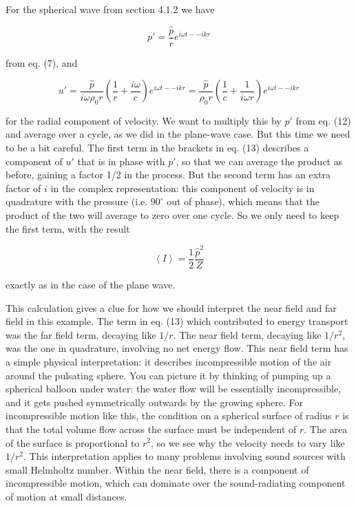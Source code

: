   For the spherical wave from section 4.1.2 we have 

  $$p'=\frac{\hat{p}}{r} e^{i \omega t -- i k r} \tag{12}$$ 

  from eq. (7), and 

  $$u' = \frac{\hat{p}}{i\omega \rho_0 r} \left( \frac{1}{r} +\frac{i 
  \omega}{c} \right) e^{i\omega t -- ikr} = \frac{\hat{p}}{\rho_0 r} 
  \left(\frac{1}{c} + \frac{1}{i \omega r}\right) e^{i\omega t -- 
  ikr}\tag{13}$$ 

  for the radial component of velocity. We want to multiply this by $p'$ from 
  eq. (12) and average over a cycle, as we did in the plane-wave case. But this 
  time we need to be a bit careful. The first term in the brackets in eq. (13) 
  describes a component of $u'$ that is in phase with $p'$, so that we can 
  average the product as before, gaining a factor 1/2 in the process. But the 
  second term has an extra factor of $i$ in the complex representation: this 
  component of velocity is in quadrature with the pressure (i.e. $90^\circ$ out 
  of phase), which means that the product of the two will average to zero over 
  one cycle. So we only need to keep the first term, with the result 

  $$\left< I \right> =\frac{1}{2} \frac{\hat{p}^2}{Z} \tag{14}$$ 

  exactly as in the case of the plane wave. 

  This calculation gives a clue for how we should interpret the near field and 
  far field in this example. The term in eq. (13) which contributed to energy 
  transport was the far field term, decaying like $1/r$. The near field term, 
  decaying like $1/r^2$, was the one in quadrature, involving no net energy 
  flow. This near field term has a simple physical interpretation: it describes 
  incompressible motion of the air around the pulsating sphere. You can picture 
  it by thinking of pumping up a spherical balloon under water: the water flow 
  will be essentially incompressible, and it gets pushed symmetrically outwards 
  by the growing sphere. For incompressible motion like this, the condition on 
  a spherical surface of radius $r$ is that the total volume flow across the 
  surface must be independent of $r$. The area of the surface is proportional 
  to $r^2$, so we see why the velocity needs to vary like $1/r^2$. This 
  interpretation applies to many problems involving sound sources with small 
  Helmholtz number. Within the near field, there is a component of 
  incompressible motion, which can dominate over the sound-radiating component 
  of motion at small distances. 


